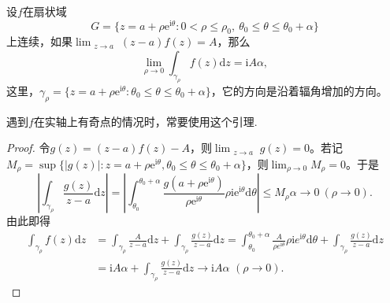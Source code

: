 \documentclass[../../main.tex]{subfiles}
\begin{document}
\begin{lemma}\label{lemma:引理5.5.9}
设$f$在扇状域
\[
G = \{ z = a + \rho \mathrm{e}^{\mathrm{i}\theta} : 0 < \rho \leqslant \rho_0, \ \theta_0 \leqslant \theta \leqslant \theta_0 + \alpha \}
\]
上连续，如果\(\lim_{\substack{z \to a}} (z - a)f(z) = A\)，那么
\[
\lim_{\rho \to 0} \int_{\gamma_{\rho}} f(z) \mathrm{d}z = \mathrm{i}A\alpha, \label{lem5.5.9_eq}
\]
这里，\(\gamma_{\rho} = \{ z = a + \rho \mathrm{e}^{\mathrm{i}\theta} : \theta_0 \leqslant \theta \leqslant \theta_0 + \alpha \}\)，它的方向是沿着辐角增加的方向。
\end{lemma}
\begin{remark}
遇到$f$在实轴上有奇点的情况时，常要使用这个引理.
\end{remark}
\begin{proof}
令\( g(z) = (z - a)f(z) - A \)，则\(\lim_{\substack{z \to a}} g(z) = 0\)。若记\( M_{\rho} = \sup\{ |g(z)| : z = a + \rho \mathrm{e}^{\mathrm{i}\theta}, \theta_0 \leqslant \theta \leqslant \theta_0 + \alpha \} \)，则\(\lim_{\rho \to 0} M_{\rho} = 0\)。于是
\[
\left| \int_{\gamma_{\rho}} \frac{g(z)}{z - a} \mathrm{d}z \right| = \left| \int_{\theta_0}^{\theta_0 + \alpha} \frac{g(a + \rho \mathrm{e}^{\mathrm{i}\theta})}{\rho \mathrm{e}^{\mathrm{i}\theta}} \rho \mathrm{i}\mathrm{e}^{\mathrm{i}\theta} \mathrm{d}\theta \right|
\leqslant M_{\rho}\alpha
\to 0 \ (\rho \to 0).
\]
由此即得
\begin{align*}
\int_{\gamma _{\rho}}{f(z)\mathrm{d}z}&=\int_{\gamma _{\rho}}{\frac{A}{z-a}\mathrm{d}z}+\int_{\gamma _{\rho}}{\frac{g(z)}{z-a}\mathrm{d}z}=\int_{\theta _0}^{\theta _0+\alpha}{\frac{A}{\rho e^{\mathrm{i}\theta}}\rho \mathrm{i}e^{\mathrm{i}\theta}\mathrm{d}\theta}+\int_{\gamma _{\rho}}{\frac{g(z)}{z-a}\mathrm{d}z}
\\
&=\mathrm{i}A\alpha +\int_{\gamma _{\rho}}{\frac{g(z)}{z-a}\mathrm{d}z}\rightarrow \mathrm{i}A\alpha \,\,(\rho \rightarrow 0).
\end{align*}
\end{proof}
\end{document}
